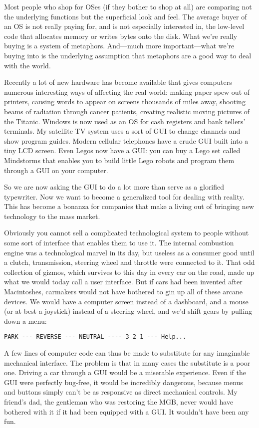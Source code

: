 \documentclass[
  fontsize=11pt,
  paper=landscape,
  twocolumn=true,
  pagesize=pdftex,
  headings=small,
  DIV=15,
  ]{scrartcl}
\begin{document}
Most people who shop for OSes (if they bother to shop at all) are
comparing not the underlying functions but the superficial look and
feel. The average buyer of an OS is not really paying for, and is not
especially interested in, the low-level code that allocates memory or
writes bytes onto the disk. What we're really buying is a system of
metaphors. And---much more important---what we're buying into is the
underlying assumption that metaphors are a good way to deal with the
world.

Recently a lot of new hardware has become available that gives computers
numerous interesting ways of affecting the real world: making paper spew
out of printers, causing words to appear on screens thousands of miles
away, shooting beams of radiation through cancer patients, creating
realistic moving pictures of the Titanic. Windows is now used as an OS
for cash registers and bank tellers' terminals. My satellite TV system
uses a sort of GUI to change channels and show program guides. Modern
cellular telephones have a crude GUI built into a tiny LCD screen. Even
Legos now have a GUI: you can buy a Lego set called Mindstorms that
enables you to build little Lego robots and program them through a GUI
on your computer.

So we are now asking the GUI to do a lot more than serve as a glorified
typewriter. Now we want to become a generalized tool for dealing with
reality. This has become a bonanza for companies that make a living out
of bringing new technology to the mass market.

Obviously you cannot sell a complicated technological system to people
without some sort of interface that enables them to use it. The internal
combustion engine was a technological marvel in its day, but useless as
a consumer good until a clutch, transmission, steering wheel and
throttle were connected to it. That odd collection of gizmos, which
survives to this day in every car on the road, made up what we would
today call a user interface. But if cars had been invented after
Macintoshes, carmakers would not have bothered to gin up all of these
arcane devices. We would have a computer screen instead of a dashboard,
and a mouse (or at best a joystick) instead of a steering wheel, and
we'd shift gears by pulling down a menu:

\begin{lstlisting}
PARK --- REVERSE --- NEUTRAL ---- 3 2 1 --- Help...
\end{lstlisting}
A few lines of computer code can thus be made to substitute for any
imaginable mechanical interface. The problem is that in many cases the
substitute is a poor one. Driving a car through a GUI would be a
miserable experience. Even if the GUI were perfectly bug-free, it would
be incredibly dangerous, because menus and buttons simply can't be as
responsive as direct mechanical controls. My friend's dad, the gentleman
who was restoring the MGB, never would have bothered with it if it had
been equipped with a GUI. It wouldn't have been any fun.
\end{document}
